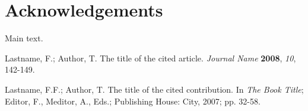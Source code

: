 \documentclass[journal,article,submit,moreauthors,pdftex,12pt,a4paper]{mdpi} %
\begin{document}
\section*{Acknowledgements}

Main text.


\makeatletter
\renewcommand\@biblabel[1]{#1. }
\makeatother
%

\begin{thebibliography}{1}
Lastname, F.; Author, T. The title of the cited article. {\em Journal Name} {\bf 2008}, {\em 10}, 142-149.


Lastname, F.F.; Author, T. The title of the cited contribution. In {\em The Book Title}; Editor, F., Meditor, A., Eds.; Publishing House: City, 2007; pp. 32-58.

\end{thebibliography}
\end{document}
